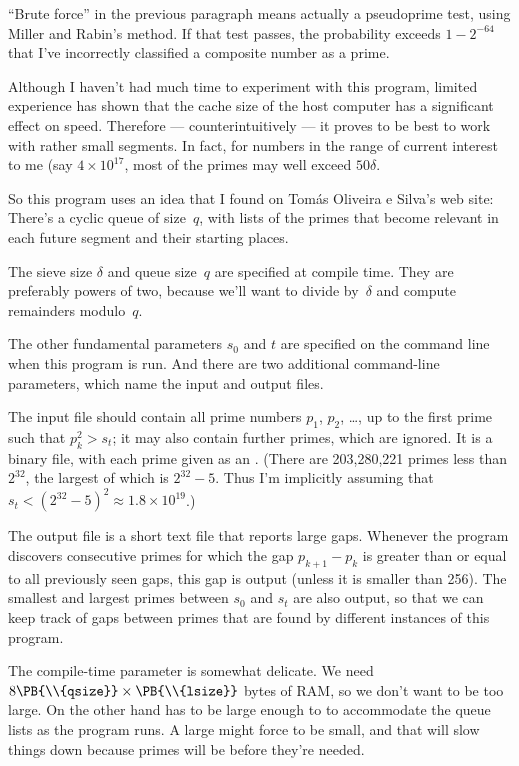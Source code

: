 ``Brute force'' in the previous paragraph means actually a pseudoprime test,
using Miller and Rabin's method.
If that test passes, the probability exceeds $1-2^{-64}$ that I've
incorrectly classified a composite number as a prime.

Although I haven't had much time to experiment with this program, limited
experience has shown that the cache size of the host computer has a
significant effect on speed. Therefore --- counterintuitively ---
it proves to be best to work with rather small segments. In fact,
for numbers in the range of current interest to me (say $4\times10^{17}$,
most of the primes may well exceed $50\delta$.

So this program uses an idea that I found on Tom\'as Oliveira e Silva's
web site: There's a cyclic queue of size~$q$, with lists of the primes that
become relevant in each future segment and their starting places.

\fi

The sieve size $\delta$ and queue size~$q$ are specified at compile time.
They are preferably powers of two, because we'll want to divide
by~$\delta$ and compute remainders modulo~$q$.

The other fundamental parameters
$s_0$ and $t$ are specified on the command line when this program
is run. And there are two additional command-line parameters,
which name the input and output files.

The input file should contain
all prime numbers $p_1$, $p_2$, \dots, up to the first prime such
that $p_k^2>s_t$; it may also contain further primes, which are ignored.
It is a binary file, with each prime given as an .
(There are 203,280,221 primes less than $2^{32}$, the largest of which
is $2^{32}-5$. Thus I'm implicitly assuming that $s_t<(2^{32}-5)^2
\approx 1.8\times10^{19}$.)

The output file is a short text file that reports large gaps.
Whenever the program discovers consecutive primes for which the gap
$p_{k+1}-p_k$ is greater than or equal to all previously seen gaps,
this gap is output (unless it is smaller than 256).
The smallest and largest
primes between $s_0$ and $s_t$ are also output, so that we can keep
track of gaps between primes that are
found by different instances of this program.

The compile-time parameter  is somewhat delicate. We need
$8\PB{\\{qsize}}\times\PB{\\{lsize}}$ bytes of {\mc RAM}, so we don't want 
to be too large. On the other hand  has to be large enough to
to accommodate the queue lists as the program runs. A large 
might force  to be small, and that will slow things down because
primes will be before they're needed.


